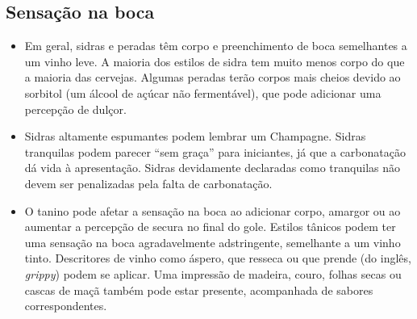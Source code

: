 \subsection*{Sensação na boca}
\begin{itemize}
\item Em geral, sidras e peradas têm corpo e preenchimento de boca semelhantes a um vinho leve. A maioria dos estilos de sidra tem muito menos corpo do que a maioria das cervejas. Algumas peradas terão corpos mais cheios devido ao sorbitol (um álcool de açúcar não fermentável), que pode adicionar uma percepção de dulçor.
\item Sidras altamente espumantes podem lembrar um Champagne. Sidras tranquilas podem parecer “sem graça” para iniciantes, já que a carbonatação dá vida à apresentação. Sidras devidamente declaradas como tranquilas não devem ser penalizadas pela falta de carbonatação.
\item O tanino pode afetar a sensação na boca ao adicionar corpo, amargor ou ao aumentar a percepção de secura no final do gole. Estilos tânicos podem ter uma sensação na boca agradavelmente adstringente, semelhante a um vinho tinto. Descritores de vinho como áspero, que resseca ou que prende (do inglês, \textit{grippy}) podem se aplicar. Uma impressão de madeira, couro, folhas secas ou cascas de maçã também pode estar presente, acompanhada de sabores correspondentes.
\end{itemize}
